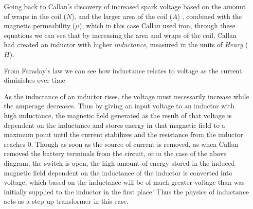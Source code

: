 \documentclass[12pt]{article}
\begin{document}
Going back to Callan's discovery of increased spark voltage based on the amount of wraps in the coil (${N}$), and the larger area of the coil (${A}$) , combined with the magnetic permeability  (${\mu}$),  which in this case Callan used iron, through these equations we can see that by increasing the area and wraps of the coil, Callan had created an inductor with higher \textit{inductance}, measured in the units of \textit{Henry} (${H}$). 

	\begin{center}
		From Faraday's law we can see how inductance relates to voltage as the current diminishes over time\\
		\vspace{5mm}
		\begin{LARGE}
			\end {LARGE}
	\end{center}

As the inductance of an inductor rises, the voltage must necessarily increase while the amperage decreases. Thus by giving an input voltage to an inductor with high inductance, the magnetic field generated as the result of that voltage is dependent on the inductance and stores energy in that magnetic field to a maximum point until the current stabilizes and the resistance from the inductor reaches 0. Though as soon as the source of current is removed, as when Callan removed the battery terminals from the circuit, or in the case of the above diagram, the switch is open, the high amount of energy stored in the induced magnetic field dependent on the inductance of the inductor is converted into voltage, which based on the inductance will be of much greater voltage than was initially supplied to the inductor in the first place!
Thus the physics of inductance acts as a step up transformer in this case. 
\end{document}
